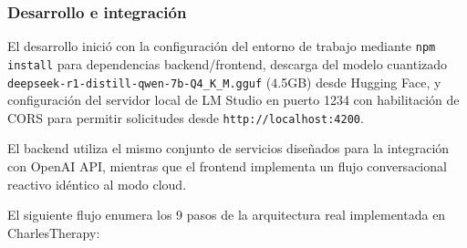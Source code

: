 \documentclass[12pt,a4paper]{report}
\numberwithin{figure}{section}
\begin{document}
\vspace{1em}
\subsubsection{Desarrollo e integración}
\label{subsubsec:desarrollo_integracion_local}

El desarrollo inició con la configuración del entorno de trabajo mediante \texttt{npm install} para dependencias backend\slash frontend, descarga del modelo cuantizado \texttt{deepseek-r1-distill-qwen-7b-Q4\_K\_M.gguf} (4.5GB) desde Hugging Face, y configuración del servidor local de LM Studio en puerto 1234 con habilitación de CORS para permitir solicitudes desde \texttt{http:\slash\slash localhost:4200}.  

El backend utiliza el mismo conjunto de servicios diseñados para la integración con OpenAI API, mientras que el frontend implementa un flujo conversacional reactivo idéntico al modo cloud.  

El siguiente flujo enumera los 9 pasos de la arquitectura real implementada en CharlesTherapy:
\end{document}
